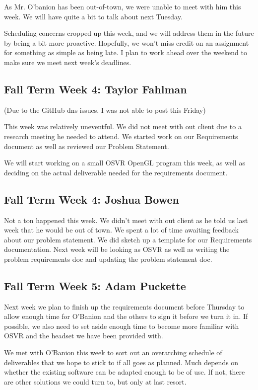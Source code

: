 \documentclass[draftclsnofoot,onecolumn]{IEEEtran}
\begin{document}
As Mr. O'banion has been out-of-town, we were unable to meet with him this week. We will have quite a bit to talk about next Tuesday.

Scheduling concerns cropped up this week, and we will address them in the future by being a bit more proactive. Hopefully, we won't miss credit on an assignment for something as simple as being late. I plan to work ahead over the weekend to make sure we meet next week's deadlines.

\subsection{Fall Term Week 4: Taylor Fahlman}

(Due to the GitHub dns issues, I was not able to post this Friday)

This week was relatively uneventful. We did not meet with out client due to a research meeting he needed to attend. We started work on our Requirements document as well as reviewed our Problem Statement.

We will start working on a small OSVR OpenGL program this week, as well as deciding on the actual deliverable needed for the requirements document.

\subsection{Fall Term Week 4: Joshua Bowen}

Not a ton happened this week. We didn't meet with out client as he told us last week that he would be out of town. We spent a lot of time awaiting feedback about our problem statement. We did sketch up a template for our Requirements documentation. Next week will be looking as OSVR as well as writing the problem requirements doc and updating the problem statement doc.

\subsection{Fall Term Week 5: Adam Puckette}

Next week we plan to finish up the requirements document before Thursday to allow enough time for O'Banion and the others to sign it before we turn it in. If possible, we also need to set aside enough time to become more familiar with OSVR and the headset we have been provided with.

We met with O'Banion this week to sort out an overarching schedule of deliverables that we hope to stick to if all goes as planned. Much depends on whether the existing software can be adapted enough to be of use. If not, there are other solutions we could turn to, but only at last resort.
\end{document}
